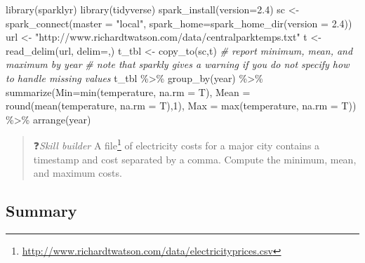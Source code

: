 \documentclass[
]{article}
\newenvironment{Shaded}{\begin{snugshade}}{\end{snugshade}}
\newcommand{\AttributeTok}[1]{\textcolor[rgb]{0.77,0.63,0.00}{#1}}
\newcommand{\CommentTok}[1]{\textcolor[rgb]{0.56,0.35,0.01}{\textit{#1}}}
\newcommand{\DecValTok}[1]{\textcolor[rgb]{0.00,0.00,0.81}{#1}}
\newcommand{\FunctionTok}[1]{\textcolor[rgb]{0.00,0.00,0.00}{#1}}
\newcommand{\NormalTok}[1]{#1}
\newcommand{\OtherTok}[1]{\textcolor[rgb]{0.56,0.35,0.01}{#1}}
\newcommand{\SpecialCharTok}[1]{\textcolor[rgb]{0.00,0.00,0.00}{#1}}
\newcommand{\StringTok}[1]{\textcolor[rgb]{0.31,0.60,0.02}{#1}}
\begin{document}
\begin{Shaded}
\begin{Highlighting}[]
\FunctionTok{library}\NormalTok{(sparklyr)}
\FunctionTok{library}\NormalTok{(tidyverse)}
\FunctionTok{spark\_install}\NormalTok{(}\AttributeTok{version=}\StringTok{\textquotesingle{}2.4\textquotesingle{}}\NormalTok{)}
\NormalTok{sc }\OtherTok{\textless{}{-}} \FunctionTok{spark\_connect}\NormalTok{(}\AttributeTok{master =} \StringTok{"local"}\NormalTok{, }\AttributeTok{spark\_home=}\FunctionTok{spark\_home\_dir}\NormalTok{(}\AttributeTok{version =} \StringTok{\textquotesingle{}2.4\textquotesingle{}}\NormalTok{))}
\NormalTok{url }\OtherTok{\textless{}{-}}  \StringTok{"http://www.richardtwatson.com/data/centralparktemps.txt"}
\NormalTok{t }\OtherTok{\textless{}{-}} \FunctionTok{read\_delim}\NormalTok{(url, }\AttributeTok{delim=}\StringTok{\textquotesingle{},\textquotesingle{}}\NormalTok{)}
\NormalTok{t\_tbl }\OtherTok{\textless{}{-}} \FunctionTok{copy\_to}\NormalTok{(sc,t)}
\CommentTok{\# report minimum, mean, and maximum by year}
\CommentTok{\# note that sparkly gives a warning if you do not specify how to handle missing values}
\NormalTok{t\_tbl }\SpecialCharTok{\%\textgreater{}\%} 
  \FunctionTok{group\_by}\NormalTok{(year) }\SpecialCharTok{\%\textgreater{}\%}
  \FunctionTok{summarize}\NormalTok{(}\AttributeTok{Min=}\FunctionTok{min}\NormalTok{(temperature, }\AttributeTok{na.rm =}\NormalTok{ T), }
            \AttributeTok{Mean =} \FunctionTok{round}\NormalTok{(}\FunctionTok{mean}\NormalTok{(temperature, }\AttributeTok{na.rm =}\NormalTok{ T),}\DecValTok{1}\NormalTok{), }
            \AttributeTok{Max =} \FunctionTok{max}\NormalTok{(temperature, }\AttributeTok{na.rm =}\NormalTok{ T)) }\SpecialCharTok{\%\textgreater{}\%}
  \FunctionTok{arrange}\NormalTok{(year)}
\end{Highlighting}
\end{Shaded}

\begin{quote}
❓\emph{Skill builder} A file\footnote{\href{http://people.terry.uga.edu/rwatson/data/electricityprices2010_14.csv}{http://www.richardtwatson.com/data/electricityprices.csv}} of electricity costs for
a major city contains a timestamp and cost separated by a comma.
Compute the minimum, mean, and maximum costs.
\end{quote}

\hypertarget{summary-10}{%
\subsection*{Summary}\label{summary-10}}
\end{document}

